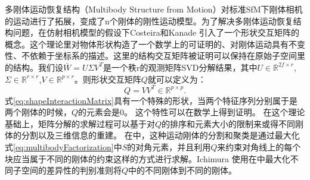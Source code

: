 多刚体运动恢复结构（Multibody Structure from Motion）对标准SfM下刚体相机的运动进行了拓展，变成了n个刚体的刚性运动模型。为了解决多刚体运动恢复结构问题，在仿射相机模型的假设下Costeira和Kanade\cite{Costeira1998A} 引入了一个形状交互矩阵的概念。这个理论里对物体形状构造了一个数学上的可证明的、对刚体运动具有不变性、不依赖于坐标系的描述。这里的结构交互矩阵被证明可以保持在原始子空间里的结构。我们设$\bar{W}=U\Sigma V^T$是一个秩r的观测矩阵SVD分解结果，其中$U\in \mathbb{R}^{2f\times r}$, $\Sigma\in \mathbb{R}^{r\times r}$,$V\in \mathbb{R}^{p\times r}$。则形状交互矩阵$Q$就可以定义为：
\begin{equation}\label{eq:shapeInteractionMatrix}
Q=VV^T\in \mathbb{R}^{p\times p}.
\end{equation}
式\eqref{eq:shapeInteractionMatrix}具有一个特殊的形状，当两个特征序列分别属于是两个刚体的时候，$Q$的元素会是0。 这个特性可以在数学上得到证明\cite{kanatani2001motionA}。 在这个理论基础上，矩阵分解的求解过程可以基于对$Q$的排序和元素大小的限制来或得不同刚体的分割以及三维信息的重建。
在\cite{Costeira1998A}中，这种运动刚体的分割和聚类是通过最大化式\eqref{eq:multibodyFactorization}中$S$的对角元素，并且利用$Q$来约束对角线上的每个块应当属于不同的刚体的约束这样的方式进行求解。Ichimura\cite{Ichimura1999Motion} 使用在\cite{Ostu2007A}中最大化不同子空间的差异性的判别准则将$Q$中的不同刚体到不同的刚体。
